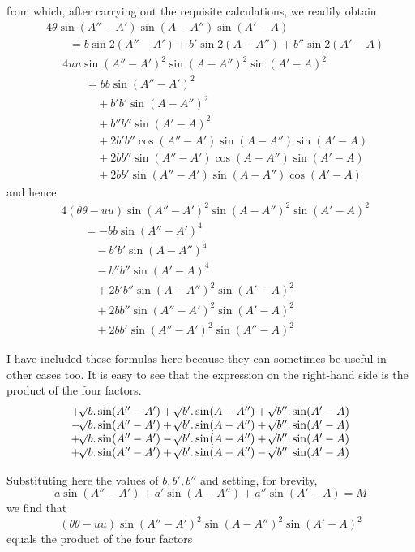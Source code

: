 %
from which, after carrying out the requisite calculations, we readily obtain
\[
\begin{aligned}
&4\theta\sin(A''-A')\sin(A-A'')\sin(A'-A)\\
&\qquad=b\sin2(A''-A')+b'\sin2(A-A'')+b''\sin2(A'-A)
\end{aligned}
\]
\[
\begin{aligned}
&4uu\sin(A''-A')^2\sin(A-A'')^2\sin(A'-A)^2\\
&\qquad=bb\sin(A''-A')^2\\
&\qquad\quad+b'b'\sin(A-A'')^2\\
&\qquad\quad+b''b''\sin(A'-A)^2\\
&\qquad\quad+2b'b''\cos(A''-A')\sin(A-A'')\sin(A'-A)\\
&\qquad\quad+2bb''\sin(A''-A')\cos(A-A'')\sin(A'-A)\\
&\qquad\quad+2bb'\sin(A''-A')\sin(A-A'')\cos(A'-A)
\end{aligned}
\]
and hence
\[
\begin{aligned}
&4(\theta\theta-uu)\sin(A''-A')^2\sin(A-A'')^2\sin(A'-A)^2\\
&\qquad=-bb\sin(A''-A')^4\\
&\qquad\quad-b'b'\sin(A-A'')^4\\
&\qquad\quad-b''b''\sin(A'-A)^4\\
&\qquad\quad+2b'b''\sin(A-A'')^2\sin(A'-A)^2\\
&\qquad\quad+2bb''\sin(A''-A')^2\sin(A'-A)^2\\
&\qquad\quad+2bb'\sin(A''-A')^2\sin(A''-A)^2
\end{aligned}
\]
\par
I have included these formulas here because they can sometimes be useful in other cases too. It is easy to see that the expression on the right-hand side is the product of the four factors.
\[
\begin{array}{l}
+\BareRoot{b}.\sin(A''-A')+\BareRoot{b'}.\sin(A-A'')+\BareRoot{b''}.\sin(A'-A)\\
-\BareRoot{b}.\sin(A''-A')+\BareRoot{b'}.\sin(A-A'')+\BareRoot{b''}.\sin(A'-A)\\
+\BareRoot{b}.\sin(A''-A')-\BareRoot{b'}.\sin(A-A'')+\BareRoot{b''}.\sin(A'-A)\\
+\BareRoot{b}.\sin(A''-A')+\BareRoot{b'}.\sin(A-A'')-\BareRoot{b''}.\sin(A'-A)
\end{array}
\]
\par
Substituting here the values of \(b,b',b''\) and setting, for brevity,
\[
a\sin(A''-A')+a'\sin(A-A'')+a''\sin(A'-A)=M
\]
we find that
\[
(\theta\theta-uu)\sin(A''-A')^2\sin(A-A'')^2\sin(A'-A)^2
\]
equals the product of the four factors
